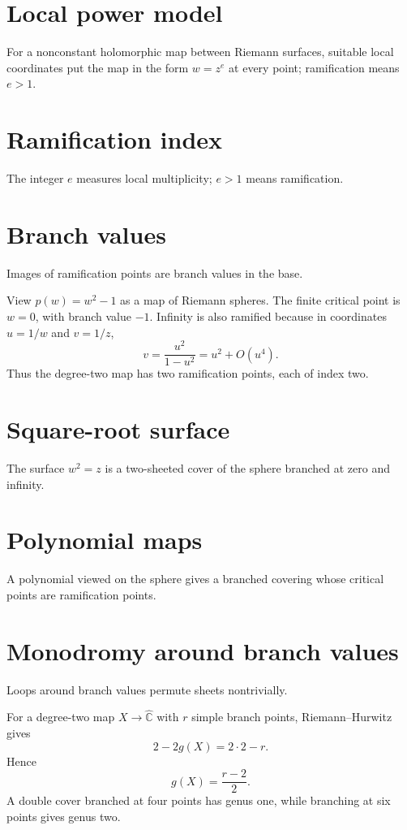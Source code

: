 \section{Local power model}
For a nonconstant holomorphic map between Riemann surfaces, suitable local coordinates put the map in the form $w=z^e$ at every point; ramification means $e>1$.

\section{Ramification index}
The integer $e$ measures local multiplicity; $e>1$ means ramification.

\section{Branch values}
Images of ramification points are branch values in the base.

\begin{example}\label{ex:iv24-expand-02}
View \(p(w)=w^2-1\) as a map of Riemann spheres. The finite critical point is \(w=0\), with branch value \(-1\). Infinity is also ramified because in coordinates \(u=1/w\) and \(v=1/z\),
\[
v=\frac{u^2}{1-u^2}=u^2+O(u^4).
\]
Thus the degree-two map has two ramification points, each of index two.
\end{example}
\section{Square-root surface}
The surface $w^2=z$ is a two-sheeted cover of the sphere branched at zero and infinity.

\section{Polynomial maps}
A polynomial viewed on the sphere gives a branched covering whose critical points are ramification points.

\section{Monodromy around branch values}
Loops around branch values permute sheets nontrivially.

\begin{example}\label{ex:iv24-expand-03}
For a degree-two map \(X\to\widehat{\mathbb C}\) with \(r\) simple branch points, Riemann--Hurwitz gives
\[
2-2g(X)=2\cdot2-r.
\]
Hence
\[
g(X)=\frac{r-2}{2}.
\]
A double cover branched at four points has genus one, while branching at six points gives genus two.
\end{example}
